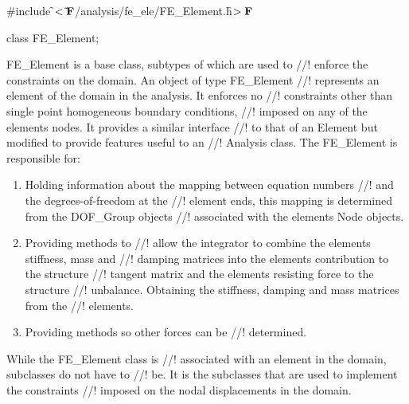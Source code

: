 
\indent \#include \f$<\tilde{ }{\bf F}$/analysis/fe\_ele/FE\_Element.h\f$>{\bf F}$

\indent class FE\_Element;

\indent FE\_Element is a base class, subtypes of which are used to
//! enforce the constraints on the domain. An object of type FE\_Element
//! represents an element of the domain in the analysis. It enforces no
//! constraints other than single point homogeneous boundary conditions,
//! imposed on any of the elements nodes. It provides a similar interface
//! to that of an Element but modified to provide features useful to an
//! Analysis class.  The FE\_Element is responsible for: \begin{enumerate}
\item Holding information about the mapping between equation numbers
//! and the degrees-of-freedom at the 
//! element ends, this mapping is determined from the DOF\_Group objects
//! associated with the elements Node objects. \item Providing methods to
//! allow the integrator to combine the elements stiffness, mass and
//! damping matrices into the elements contribution to the structure
//! tangent matrix and the elements resisting force to the structure
//! unbalance. Obtaining the stiffness, damping and mass matrices from the
//! elements. \item Providing methods so other forces can be
//! determined. \end{enumerate} While the FE\_Element class is
//! associated with an element in the domain, subclasses do not have to
//! be. It is the subclasses that are used to implement the constraints
//! imposed on the nodal displacements in the domain.

